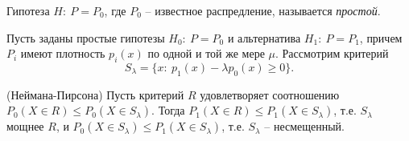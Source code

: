 \begin{definition}
    Гипотеза $\displaystyle H:\ P=P_{0}$, где $\displaystyle P_{0}$ -- известное распредление, называется \textit{простой}.
\end{definition}
Пусть заданы простые гипотезы $\displaystyle H_{0} :\ P=P_{0}$ и альтернатива $\displaystyle H_{1} :\ P=P_{1}$, причем $\displaystyle P_{i}$ имеют плотность $\displaystyle p_{i}( x)$ по одной и той же мере $\displaystyle \mu $. Рассмотрим критерий
\begin{equation*}
    S_{\lambda } =\{x:\ p_{1}( x) -\lambda p_{0}( x) \geqslant 0\} .
\end{equation*}
\begin{lemma}
    (Неймана-Пирсона) Пусть критерий $\displaystyle R$ удовлетворяет соотношению $\displaystyle P_{0}( X\in R) \leqslant P_{0}( X\in S_{\lambda })$. Тогда $\displaystyle P_{1}( X\in R) \leqslant P_{1}( X\in S_{\lambda })$, т.е. $\displaystyle S_{\lambda }$ мощнее $\displaystyle R$, и $\displaystyle P_{0}( X\in S_{\lambda }) \leqslant P_{1}( X\in S_{\lambda })$, т.е. $\displaystyle S_\lambda$ -- несмещенный.
\end{lemma}
